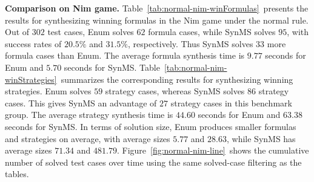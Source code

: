 \documentclass[review]{elsarticle}
\begin{document}
\textbf{Comparison on Nim game.}
Table~\ref{tab:normal-nim-winFormulas}~presents the results for synthesizing winning formulas in the Nim game under the normal rule.
Out of $302$ test cases, Enum solves $62$ formula cases, while SynMS solves $95$, with success rates of $20.5\%$ and $31.5\%$, respectively.
Thus SynMS solves $33$ more formula cases than Enum.
The average formula synthesis time is $9.77$ seconds for Enum and $5.70$ seconds for SynMS.
Table~\ref{tab:normal-nim-winStrategies}~summarizes the corresponding results for synthesizing winning strategies.
Enum solves $59$ strategy cases, whereas SynMS solves $86$ strategy cases.
This gives SynMS an advantage of $27$ strategy cases in this benchmark group.
The average strategy synthesis time is $44.60$ seconds for Enum and $63.38$ seconds for SynMS.
In terms of solution size, Enum produces smaller formulas and strategies on average, with average sizes $5.77$ and $28.63$, while SynMS has average sizes $71.34$ and $481.79$.
Figure~\ref{fig:normal-nim-line}~shows the cumulative number of solved test cases over time using the same solved-case filtering as the tables.
\end{document}

